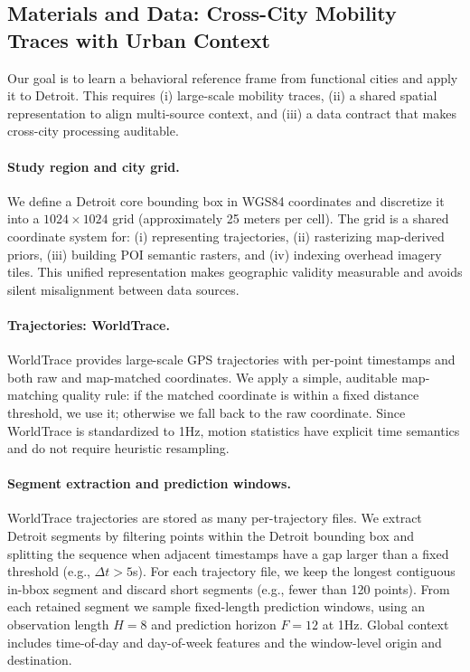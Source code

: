 \subsection{Materials and Data: Cross-City Mobility Traces with Urban Context}
Our goal is to learn a behavioral reference frame from functional cities and apply it to Detroit. This requires (i) large-scale mobility traces, (ii) a shared spatial representation to align multi-source context, and (iii) a data contract that makes cross-city processing auditable.

\paragraph{Study region and city grid.}
We define a Detroit core bounding box in WGS84 coordinates and discretize it into a $1024\times 1024$ grid (approximately 25 meters per cell). The grid is a shared coordinate system for: (i) representing trajectories, (ii) rasterizing map-derived priors, (iii) building POI semantic rasters, and (iv) indexing overhead imagery tiles. This unified representation makes geographic validity measurable and avoids silent misalignment between data sources.

\paragraph{Trajectories: WorldTrace.}
WorldTrace provides large-scale GPS trajectories with per-point timestamps and both raw and map-matched coordinates. We apply a simple, auditable map-matching quality rule: if the matched coordinate is within a fixed distance threshold, we use it; otherwise we fall back to the raw coordinate. Since WorldTrace is standardized to 1Hz, motion statistics have explicit time semantics and do not require heuristic resampling.

\paragraph{Segment extraction and prediction windows.}
WorldTrace trajectories are stored as many per-trajectory files. We extract Detroit segments by filtering points within the Detroit bounding box and splitting the sequence when adjacent timestamps have a gap larger than a fixed threshold (e.g., $\Delta t>5$s). For each trajectory file, we keep the longest contiguous in-bbox segment and discard short segments (e.g., fewer than 120 points). From each retained segment we sample fixed-length prediction windows, using an observation length $H=8$ and prediction horizon $F=12$ at 1Hz. Global context includes time-of-day and day-of-week features and the window-level origin and destination.

